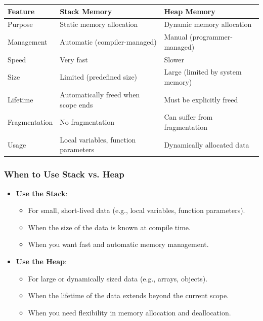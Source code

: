 \begin{table}[H]
    \centering
    \small
\begin{tabular}{|l|l|l|}
    \hline
    \hfill \textbf{Feature} \hfill & \hfill \textbf{Stack Memory} \hfill & \hfill \textbf{Heap Memory} \hfill \\ \hline
    Purpose & Static memory allocation & Dynamic memory allocation \\ \hline
    Management & Automatic (compiler-managed) & Manual (programmer-managed) \\ \hline
    Speed & Very fast & Slower \\ \hline
    Size & Limited (predefined size) & Large (limited by system memory) \\ \hline
    Lifetime & Automatically freed when scope ends & Must be explicitly freed \\ \hline
    Fragmentation & No fragmentation & Can suffer from fragmentation \\ \hline
    Usage & Local variables, function parameters & Dynamically allocated data \\ \hline
\end{tabular}
\end{table}

\vspace{-0.5em}

\subsubsection{When to Use Stack vs. Heap}

\vspace{-0.5em}

\begin{itemize}
    \item \textbf{Use the Stack}:
    \begin{itemize}
        \item For small, short-lived data (e.g., local variables, function parameters).
        \item When the size of the data is known at compile time.
        \item When you want fast and automatic memory management.
    \end{itemize}
    \item \textbf{Use the Heap}:
    \begin{itemize}
        \item For large or dynamically sized data (e.g., arrays, objects).
        \item When the lifetime of the data extends beyond the current scope.
        \item When you need flexibility in memory allocation and deallocation.
    \end{itemize}
\end{itemize}

